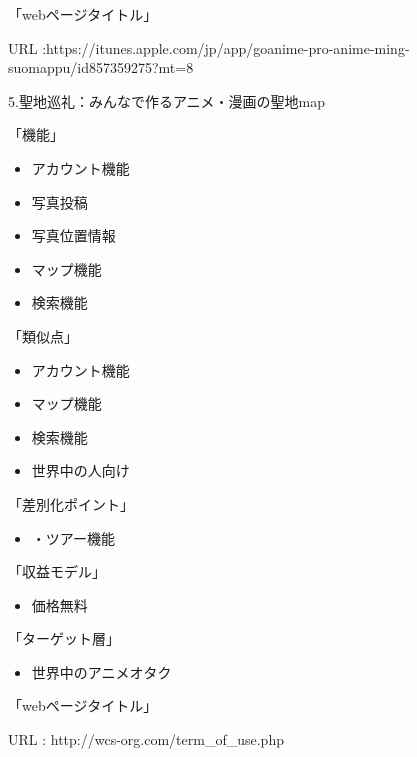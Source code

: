 「webページタイトル」
\par URL :https://itunes.apple.com/jp/app/goanime-pro-anime-ming-suomappu/id857359275?mt=8
\\
\par 5.聖地巡礼：みんなで作るアニメ・漫画の聖地map
\par 「機能」
\begin{itemize}
\item アカウント機能
\item 写真投稿
\item 写真位置情報
\item マップ機能
\item 検索機能
\end{itemize}
「類似点」
\begin{itemize}
\item アカウント機能
\item マップ機能
\item 検索機能
\item 世界中の人向け
\end{itemize}
「差別化ポイント」
\begin{itemize}
\item ・ツアー機能
\end{itemize}
「収益モデル」
\begin{itemize}
\item 価格無料
\end{itemize}
「ターゲット層」
\begin{itemize}
\item 世界中のアニメオタク
\end{itemize}
「webページタイトル」
\par URL : http://wcs-org.com/term\_of\_use.php
